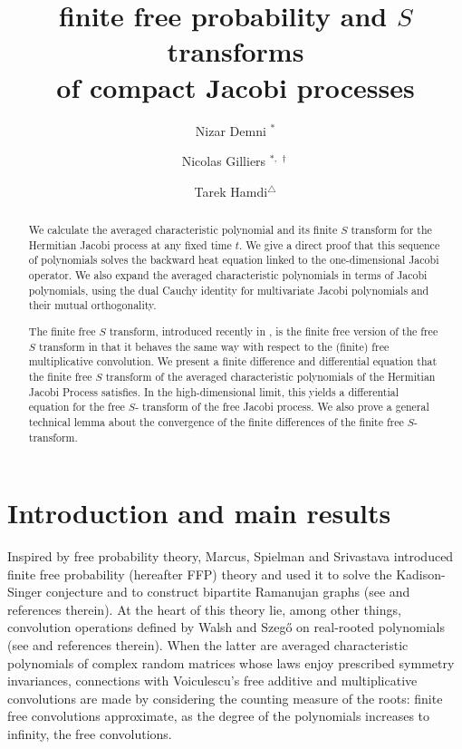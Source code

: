 \documentclass[12pt,reqno]{amsart}
\title[]{finite free probability and $S$ transforms \\ of compact Jacobi processes}
\author[Nizar Demni]{Nizar Demni ${}^{*}$}
\author{Nicolas Gilliers ${}^{*,\,\dagger}$}
\author[]{Tarek Hamdi${}^{\triangle}$}
\begin{document}
\maketitle
\begin{abstract}
We calculate the averaged characteristic polynomial and its finite $S$ transform for the Hermitian Jacobi process at any fixed time $t$. We give a direct proof that this sequence of polynomials solves the backward heat equation linked to the one-dimensional Jacobi operator. We also expand the averaged characteristic polynomials in terms of Jacobi polynomials, using the dual Cauchy identity for multivariate Jacobi polynomials and their mutual orthogonality. 

The finite free $S$ transform, introduced recently in \cite{arizmendi2024s}, is the finite free version of the free $S$ transform in that it behaves the same way with respect to the (finite) free multiplicative convolution. We present a finite difference and differential equation that the finite free $S$ transform of the averaged characteristic polynomials of the Hermitian Jacobi Process satisfies. In the high-dimensional limit, this yields a differential equation for the free $S$- transform of the free Jacobi process. We also prove a general technical lemma about the convergence of the finite differences of the finite free $ S$- transform.

\end{abstract}

\tableofcontents

\section{Introduction and main results}
 Inspired by free probability theory, Marcus, Spielman and Srivastava introduced finite free probability (hereafter FFP) theory and used it to solve the Kadison-Singer conjecture and to construct bipartite Ramanujan graphs (see \cite{MR4408504} and references therein). At the heart of this theory lie, among other things, convolution operations defined by Walsh and Szegő on real-rooted polynomials (see \cite{MR4408504} and references therein). When the latter are averaged characteristic polynomials of complex random matrices whose laws enjoy prescribed symmetry invariances, connections with Voiculescu’s free additive and multiplicative convolutions are made by considering the counting measure of the roots: finite free convolutions approximate, as the degree of the polynomials increases to infinity, the free convolutions. 
\end{document}
